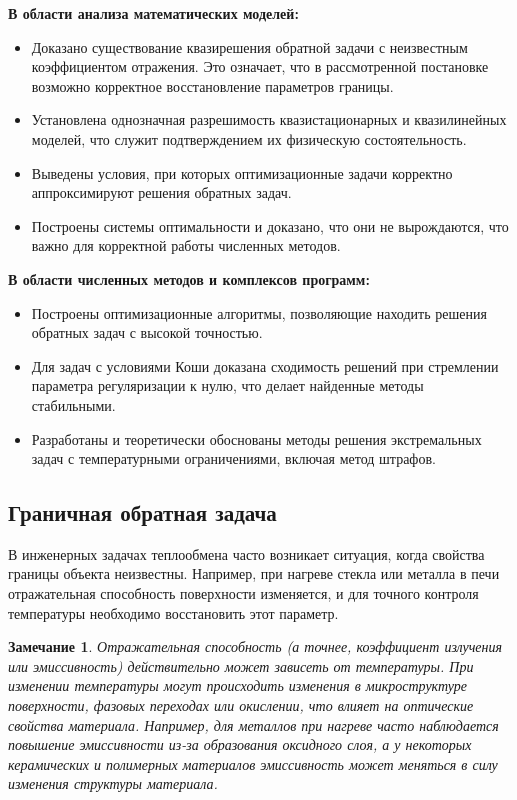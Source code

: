 \documentclass[8pt,a4paper]{article}
\newtheorem*{remark}{Замечание}
\begin{document}
    \textbf{В области анализа математических моделей:}
    \begin{itemize}
        \item Доказано существование квазирешения обратной задачи с неизвестным коэффициентом отражения. Это означает, что в рассмотренной постановке возможно корректное восстановление параметров границы.
        \item Установлена однозначная разрешимость квазистационарных и квазилинейных моделей, что служит подтверждением их физическую состоятельность.
        \item Выведены условия, при которых оптимизационные задачи корректно аппроксимируют решения обратных задач.
        \item Построены системы оптимальности и доказано, что они не вырождаются, что важно для корректной работы численных методов.
    \end{itemize}

    \textbf{В области численных методов и комплексов программ:}
    \begin{itemize}
        \item Построены оптимизационные алгоритмы, позволяющие находить решения обратных задач с высокой точностью.
        \item Для задач с условиями Коши доказана сходимость решений при стремлении параметра регуляризации к нулю, что делает найденные методы стабильными.
        \item Разработаны и теоретически обоснованы методы решения экстремальных задач с температурными ограничениями,
        включая метод штрафов.
    \end{itemize}


    \subsection*{Граничная обратная задача}
    В инженерных задачах теплообмена часто возникает ситуация, когда свойства границы объекта неизвестны.
    Например, при нагреве стекла или металла в печи отражательная способность поверхности изменяется,
    и для точного контроля температуры необходимо восстановить этот параметр.
    \begin{remark}
        Отражательная способность (а точнее, коэффициент излучения или эмиссивность) действительно может зависеть от температуры.
        При изменении температуры могут происходить изменения в микроструктуре поверхности,
        фазовых переходах или окислении, что влияет на оптические свойства материала.
        Например, для металлов при нагреве часто наблюдается повышение эмиссивности
        из-за образования оксидного слоя, а у некоторых керамических и полимерных материалов эмиссивность
        может меняться в силу изменения структуры материала.
    \end{remark}
\end{document}
